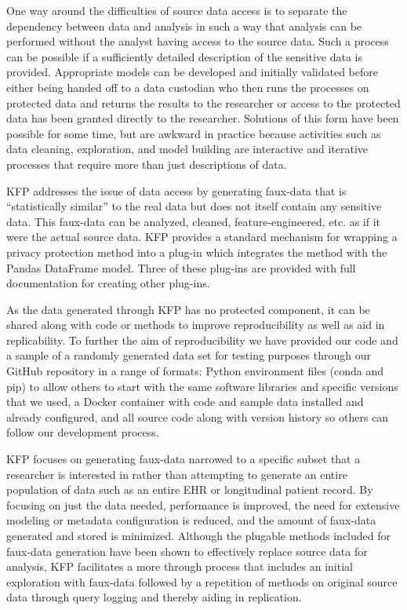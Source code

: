 \documentclass{article}
\begin{document}
One way around the difficulties of source data access is to separate the dependency between data and analysis in such a way that analysis can be performed without the analyst having access to the source data. Such a process can be possible if a sufficiently detailed description of the sensitive data is provided. Appropriate models can be developed and initially validated before either being handed off to a data custodian who then runs the processes on protected data and returns the results to the researcher or access to the protected data has been granted directly to the researcher. Solutions of this form have been possible for some time, but are awkward in practice because activities such as data cleaning, exploration, and model building are interactive and iterative processes that require more than just descriptions of data.

KFP addresses the issue of data access by generating faux-data that is ``statistically similar'' to the real data but does not itself contain any sensitive data. This faux-data can be analyzed, cleaned, feature-engineered, etc. as if it were the actual source data. KFP provides a standard mechanism for wrapping a privacy protection method into a plug-in which integrates the method with the Pandas DataFrame model. Three of these plug-ins are provided with full documentation for creating other plug-ins.

As the data generated through KFP has no protected component, it can be shared along with code or methods to improve reproducibility as well as aid in replicability. To further the aim of reproducibility we have provided our code and a sample of a randomly generated data set for testing purposes through our GitHub repository in a range of formats: Python environment files (conda and pip) to allow others to start with the same software libraries and specific versions that we used, a Docker container with code and sample data installed and already configured, and all source code along with version history so others can follow our development process.

KFP focuses on generating faux-data narrowed to a specific subset that a researcher is interested in rather than attempting to generate an entire population of data such as an entire EHR or longitudinal patient record. By focusing on just the data needed, performance is improved, the need for extensive modeling or metadata configuration is reduced, and the amount of faux-data generated and stored is minimized. Although the plugable methods included for faux-data generation have been shown to effectively replace source data for analysis, KFP facilitates a more through process that includes an initial exploration with faux-data followed by a repetition of methods on original source data through query logging and thereby aiding in replication.
\end{document}
